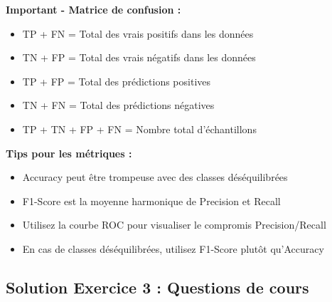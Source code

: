 \documentclass[11pt,a4paper]{article}
\begin{document}
\begin{importantbox}
\textbf{Important - Matrice de confusion :}
\begin{itemize}
    \item TP + FN = Total des vrais positifs dans les données
    \item TN + FP = Total des vrais négatifs dans les données
    \item TP + FP = Total des prédictions positives
    \item TN + FN = Total des prédictions négatives
    \item TP + TN + FP + FN = Nombre total d'échantillons
\end{itemize}
\end{importantbox}

\begin{tipbox}
\textbf{Tips pour les métriques :}
\begin{itemize}
    \item Accuracy peut être trompeuse avec des classes déséquilibrées
    \item F1-Score est la moyenne harmonique de Precision et Recall
    \item Utilisez la courbe ROC pour visualiser le compromis Precision/Recall
    \item En cas de classes déséquilibrées, utilisez F1-Score plutôt qu'Accuracy
\end{itemize}
\end{tipbox}

\subsection{Solution Exercice 3 : Questions de cours}
\end{document}
